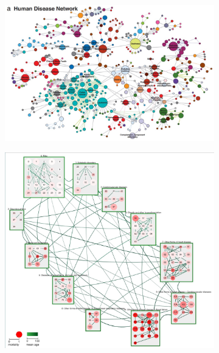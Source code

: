 \begin{figure}[h]
    \centering
    \begin{subfigure}[b]{0.4\columnwidth}
        \centering
        \includegraphics[width=\textwidth, trim={0 0 9cm 0},clip]{graphics/Human_Disease_Network.jpg}
        \label{fig:Human_Disease_Network}
    \end{subfigure}\hfill
    \begin{subfigure}[b]{0.5\columnwidth}
      \centering
      \includegraphics[width=\textwidth]{graphics/original2DdiseaseNet.jpg}

\end{subfigure}
\end{figure}
